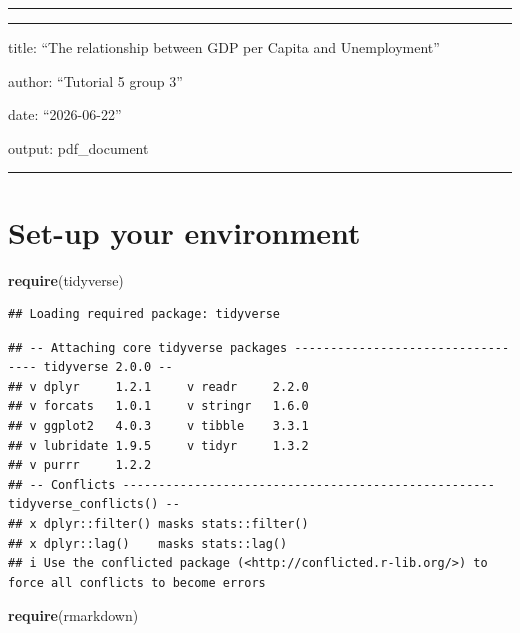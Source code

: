 \documentclass[
]{article}
\author{}
\date{\vspace{-2.5em}}
\newenvironment{Shaded}{\begin{snugshade}}{\end{snugshade}}
\newcommand{\FunctionTok}[1]{\textcolor[rgb]{0.13,0.29,0.53}{\textbf{#1}}}
\newcommand{\NormalTok}[1]{#1}
\begin{document}
\begin{center}\rule{0.5\linewidth}{0.5pt}\end{center}

\begin{center}\rule{0.5\linewidth}{0.5pt}\end{center}

title: ``The relationship between GDP per Capita and Unemployment''

author: ``Tutorial 5 group 3''

date: ``2026-06-22''

output: pdf\_document

\begin{center}\rule{0.5\linewidth}{0.5pt}\end{center}

\section{Set-up your environment}\label{set-up-your-environment}

\begin{Shaded}
\begin{Highlighting}[]
\FunctionTok{require}\NormalTok{(tidyverse)}
\end{Highlighting}
\end{Shaded}

\begin{verbatim}
## Loading required package: tidyverse
\end{verbatim}

\begin{verbatim}
## -- Attaching core tidyverse packages ---------------------------------- tidyverse 2.0.0 --
## v dplyr     1.2.1     v readr     2.2.0
## v forcats   1.0.1     v stringr   1.6.0
## v ggplot2   4.0.3     v tibble    3.3.1
## v lubridate 1.9.5     v tidyr     1.3.2
## v purrr     1.2.2     
## -- Conflicts ---------------------------------------------------- tidyverse_conflicts() --
## x dplyr::filter() masks stats::filter()
## x dplyr::lag()    masks stats::lag()
## i Use the conflicted package (<http://conflicted.r-lib.org/>) to force all conflicts to become errors
\end{verbatim}

\begin{Shaded}
\begin{Highlighting}[]
\FunctionTok{require}\NormalTok{(rmarkdown)}
\end{Highlighting}
\end{Shaded}
\end{document}

